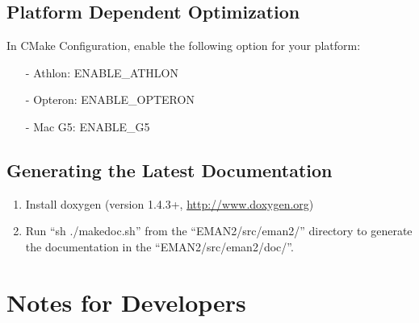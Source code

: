 \subsection{Platform Dependent Optimization}


    In CMake Configuration, enable the following option for your platform:
    \begin{itemize}
        \item[-] Athlon:  ENABLE\_ATHLON
        \item[-] Opteron: ENABLE\_OPTERON
        \item[-] Mac G5:  ENABLE\_G5
    \end{itemize}
          
\subsection{Generating the  Latest Documentation}

  \begin{enumerate}
    \item
      Install doxygen (version 1.4.3+, \href{http://www.doxygen.org}{http://www.doxygen.org})

    \item
      Run {\color{blue}``sh ./makedoc.sh''} from the ``EMAN2/src/eman2/'' directory to
   generate the documentation in the ``EMAN2/src/eman2/doc/''.
  \end{enumerate}


\section{Notes for Developers} 
\label{DEVELOPERS-NOTES} 

